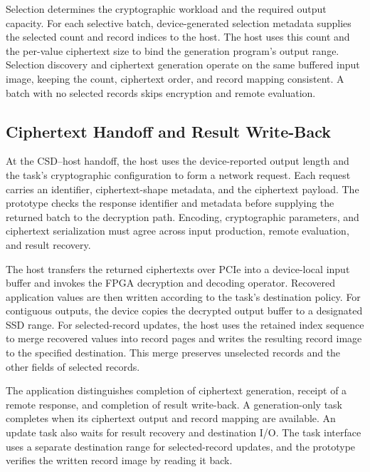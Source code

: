 Selection determines the cryptographic workload and the required output capacity. For each selective batch, device-generated selection metadata supplies the selected count and record indices to the host. The host uses this count and the per-value ciphertext size to bind the generation program's output range. Selection discovery and ciphertext generation operate on the same buffered input image, keeping the count, ciphertext order, and record mapping consistent. A batch with no selected records skips encryption and remote evaluation.

\subsection{Ciphertext Handoff and Result Write-Back}
\label{subsec:ciphertext-handoff}

At the CSD--host handoff, the host uses the device-reported output length and the task's cryptographic configuration to form a network request. Each request carries an identifier, ciphertext-shape metadata, and the ciphertext payload. The prototype checks the response identifier and metadata before supplying the returned batch to the decryption path. Encoding, cryptographic parameters, and ciphertext serialization must agree across input production, remote evaluation, and result recovery.

The host transfers the returned ciphertexts over PCIe into a device-local input buffer and invokes the FPGA decryption and decoding operator. Recovered application values are then written according to the task's destination policy. For contiguous outputs, the device copies the decrypted output buffer to a designated SSD range. For selected-record updates, the host uses the retained index sequence to merge recovered values into record pages and writes the resulting record image to the specified destination. This merge preserves unselected records and the other fields of selected records.

The application distinguishes completion of ciphertext generation, receipt of a remote response, and completion of result write-back. A generation-only task completes when its ciphertext output and record mapping are available. An update task also waits for result recovery and destination I/O. The task interface uses a separate destination range for selected-record updates, and the prototype verifies the written record image by reading it back.
